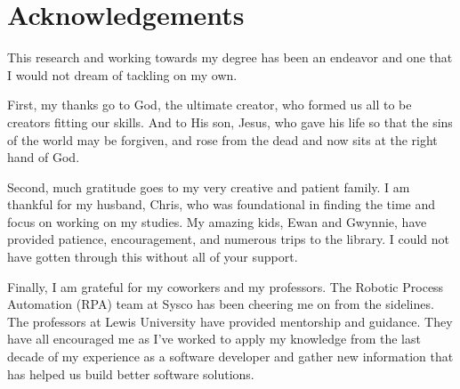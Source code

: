 \section*{Acknowledgements} \label{sectionAcknowledgements}

This research and working towards my degree has been an endeavor and one that I would not dream of tackling on my own.

First, my thanks go to God, the ultimate creator, who formed us all to be creators fitting our skills. And to His son, Jesus, who gave his life so that the sins of the world may be forgiven, and rose from the dead and now sits at the right hand of God.

Second, much gratitude goes to my very creative and patient family. I am thankful for my husband, Chris, who was foundational in finding the time and focus on working on my studies. My amazing kids, Ewan and Gwynnie, have provided patience, encouragement, and numerous trips to the library. I could not have gotten through this without all of your support.

Finally, I am grateful for my coworkers and my professors. The Robotic Process Automation (RPA) team at Sysco has been cheering me on from the sidelines. The professors at Lewis University have provided mentorship and guidance. They have all encouraged me as I've worked to apply my knowledge from the last decade of my experience as a software developer and gather new information that has helped us build better software solutions.
